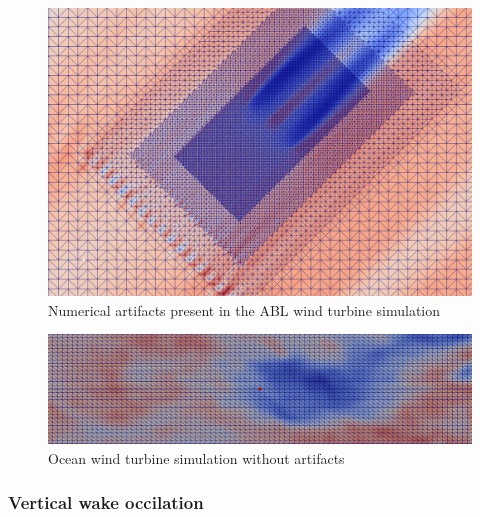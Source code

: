 \begin{figure}
\centering
\includegraphics[width=\textwidth]{images/neutralWindPlantAvgVelPlanMeshRefine}
\caption{Numerical artifacts present in the ABL wind turbine simulation}
\label{fig:neutralWindPlantAvgVelPlanMeshRefine}
\end{figure}

\begin{figure}
\centering
\includegraphics[width=\textwidth]{images/OceanMeshRefinement}
\caption{Ocean wind turbine simulation without artifacts}
\label{fig:OceanMeshRefinement}
\end{figure}



\subsubsection{Vertical wake occilation}



